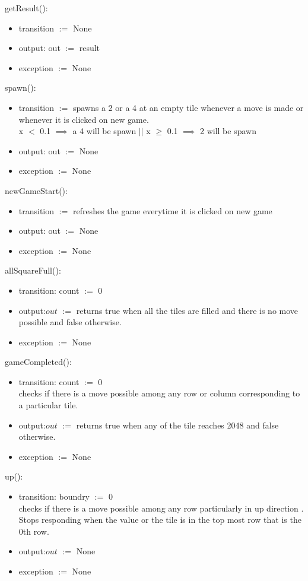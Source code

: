 \documentclass[12pt]{article}
\begin{document}
\noindent getResult():
\begin{itemize}
   \item transition $:=$ None
     \item output: out $:=$ result
       \item exception $:=$ None
       \end{itemize}
       
\noindent spawn():
\begin{itemize}
   \item transition $:=$ spawns a 2 or a 4 at an empty tile whenever a move is made or whenever it is clicked on new game.\\
   x $<$ 0.1 $\implies$ a 4 will be spawn $||$ x $\ge$ 0.1 $\implies$ 2 will be spawn
     \item output: out $:=$ None
       \item exception $:=$ None
       \end{itemize}
       
\noindent newGameStart():
\begin{itemize}
   \item transition $:=$ refreshes the game everytime it is clicked on new game
     \item output: out $:=$ None
       \item exception $:=$ None
       \end{itemize}

\noindent allSquareFull():
\begin{itemize}
\item transition: count $:=$ 0
  \item output:$out$ $:=$ returns true when all the tiles are filled and there is no move possible and false otherwise.
      \item exception $:=$ None
\end{itemize}

\noindent gameCompleted():
\begin{itemize}
\item transition: count $:=$ 0\\
 checks if there is a move possible among any row or column corresponding to a particular tile. 
  \item output:$out$ $:=$ returns true when any of the tile reaches 2048 and false otherwise.
      \item exception $:=$ None
\end{itemize}

\noindent up():
\begin{itemize}
\item transition: boundry $:=$ 0\\
 checks if there is a move possible among any row particularly in up direction . Stops responding when the
 value or the tile is in the top most row that is the 0th row.
  \item output:$out$ $:=$ None
      \item exception $:=$ None
\end{itemize}
\end{document}
